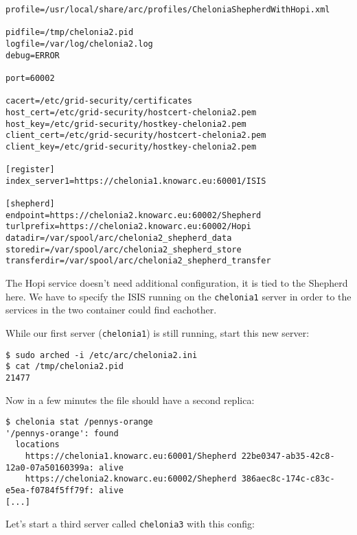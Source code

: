\documentclass{article}
\begin{document}
\begin{verbatim}
profile=/usr/local/share/arc/profiles/CheloniaShepherdWithHopi.xml

pidfile=/tmp/chelonia2.pid
logfile=/var/log/chelonia2.log
debug=ERROR

port=60002

cacert=/etc/grid-security/certificates
host_cert=/etc/grid-security/hostcert-chelonia2.pem
host_key=/etc/grid-security/hostkey-chelonia2.pem
client_cert=/etc/grid-security/hostcert-chelonia2.pem
client_key=/etc/grid-security/hostkey-chelonia2.pem

[register]
index_server1=https://chelonia1.knowarc.eu:60001/ISIS

[shepherd]
endpoint=https://chelonia2.knowarc.eu:60002/Shepherd
turlprefix=https://chelonia2.knowarc.eu:60002/Hopi
datadir=/var/spool/arc/chelonia2_shepherd_data
storedir=/var/spool/arc/chelonia2_shepherd_store
transferdir=/var/spool/arc/chelonia2_shepherd_transfer
\end{verbatim}

The Hopi service doesn't need additional configuration, it is tied to the Shepherd here. We have to specify the ISIS running on the \verb!chelonia1! server in order to the services in the two container could find eachother.

While our first server (\verb!chelonia1!) is still running, start this new server:

\begin{verbatim}
$ sudo arched -i /etc/arc/chelonia2.ini
$ cat /tmp/chelonia2.pid
21477
\end{verbatim}

Now in a few minutes the file should have a second replica:

\begin{verbatim}
$ chelonia stat /pennys-orange
'/pennys-orange': found
  locations
    https://chelonia1.knowarc.eu:60001/Shepherd 22be0347-ab35-42c8-12a0-07a50160399a: alive
    https://chelonia2.knowarc.eu:60002/Shepherd 386aec8c-174c-c83c-e5ea-f0784f5ff79f: alive
[...]
\end{verbatim}

Let's start a third server called \verb!chelonia3! with this config:
\end{document}
